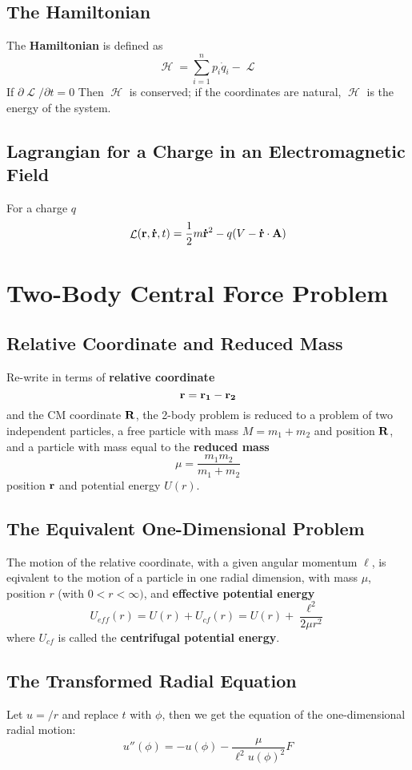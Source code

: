 \documentclass{article}
\DeclareMathOperator{\Lagr}{\mathcal{L}}
\DeclareMathOperator{\Ham}{\mathcal{H}}
\begin{document}
\subsection{The Hamiltonian}
The \textbf{Hamiltonian} is defined as 
$$
\Ham = \sum_{i=1}^{n} p_i \dot q_i - \Lagr
$$
If $\partial \Lagr / \partial t = 0$ Then $\Ham$ is conserved; if the coordinates are natural, $\Ham$ is the energy of the system.

\subsection{Lagrangian for a Charge in an Electromagnetic Field}
For a charge $q$
$$
\Lagr(\vb{r}, \vb{\dot r}, t) = \frac{1}{2} m \vb{\dot r}^2 - q(V - \vb{\dot r} \cdot \vb{A})
$$

\section{Two-Body Central Force Problem}
\subsection{Relative Coordinate and Reduced Mass}
Re-write in terms of \textbf{relative coordinate}
$$
\vb{r} = \vb{r_1} - \vb{r_2}
$$
and the CM coordinate $\vb{R}$, the 2-body problem is reduced to a problem of two independent particles, a free particle with mass $M = m_1 + m_2$ and position $\vb{R}$, and a particle with mass equal to the \textbf{reduced mass}
$$
\mu = \frac{m_1  m_2}{m_1 + m_2}
$$
position $\vb{r}$ and potential energy $U(r)$.
\subsection{The Equivalent One-Dimensional Problem}
The motion of the relative coordinate, with a given angular momentum $\ell$, is eqivalent to the motion of a particle in one radial dimension, with mass $\mu$, position $r$ (with $0 < r < \infty)$, and \textbf{effective potential energy}
$$
U_{eff}(r) = U(r) + U_{cf}(r) = U(r) + \frac{\ell^2}{2\mu r^2}
$$
where $U_{cf}$ is called the \textbf{centrifugal potential energy}.
\subsection{The Transformed Radial Equation}
Let $u = /r$ and replace $t$ with $\phi$, then we get the equation of the one-dimensional radial motion:
$$
u''(\phi) = -u(\phi) - \frac{\mu}{\ell^2 u(\phi)^2} F
$$
\end{document}
